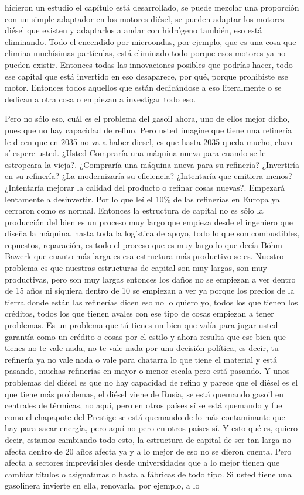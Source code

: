hicieron un estudio el capítulo está desarrollado, se puede mezclar una proporción con un simple adaptador en los motores diésel, se pueden adaptar los motores diésel que existen y adaptarlos a andar con hidrógeno también, eso está eliminando. Todo el encendido por microondas, por ejemplo, que es una cosa que elimina muchísimas partículas, está eliminado todo porque esos motores ya no pueden existir. Entonces todas las innovaciones posibles que podrías hacer, todo ese capital que está invertido en eso desaparece, por qué, porque prohibiste ese motor. Entonces todos aquellos que están dedicándose a eso literalmente o se dedican a otra cosa o empiezan a investigar todo eso.

Pero no sólo eso, cuál es el problema del gasoil ahora, uno de ellos mejor dicho, pues que no hay capacidad de refino. Pero usted imagine que tiene una refinería le dicen que en 2035 no va a haber diesel, es que hasta 2035 queda mucho, claro sí espere usted. ¿Usted Compraría una máquina nueva para cuando se le estropeara la vieja?. ¿Compraría una máquina nueva para su refinería? ¿Invertiría en su refinería? ¿La modernizaría su eficiencia? ¿Intentaría que emitiera menos? ¿Intentaría mejorar la calidad del producto o refinar cosas nuevas?. Empezará lentamente a desinvertir. Por lo que leí el 10\% de las refinerías en Europa ya cerraron como es normal. Entonces la estructura de capital no es sólo la producción del bien es un proceso muy largo que empieza desde el ingeniero que diseña la máquina, hasta toda la logística de apoyo, todo lo que son combustibles, repuestos, reparación, es todo el proceso que es muy largo lo que decía Böhm-Bawerk que cuanto más larga es esa estructura más productivo se es. Nuestro problema es que nuestras estructuras de capital son muy largas, son muy productivas, pero son muy largas entonces los daños no se empiezan a ver dentro de 15 años ni siquiera dentro de 10 se empiezan a ver ya porque los precios de la tierra donde están las refinerías dicen eso no lo quiero yo, todos los que tienen los créditos, todos los que tienen avales con ese tipo de cosas empiezan a tener problemas. Es un problema que tú tienes un bien que valía para jugar usted garantía como un crédito o cosas por el estilo y ahora resulta que ese bien que tienes no te vale nada, no te vale nada por una decisión política, es decir, tu refinería ya no vale nada o vale para chatarra lo que tiene el material y está pasando, muchas refinerías en mayor o menor escala pero está pasando. Y unos problemas del diésel es que no hay capacidad de refino y parece que el diésel es el que tiene más problemas, el diésel viene de Rusia, se está quemando gasoil en centrales de térmicas, no aquí, pero en otros países sí se está quemando y fuel como el chapapote del Prestige se está quemando de lo más contaminante que hay para sacar energía, pero aquí no pero en otros países sí. Y esto qué es, quiero decir, estamos cambiando todo esto, la estructura de capital de ser tan larga no afecta dentro de 20 años afecta ya y a lo mejor de eso no se dieron cuenta. Pero afecta a sectores imprevisibles desde universidades que a lo mejor tienen que cambiar títulos o asignaturas o hasta a fábricas de todo tipo. Si usted tiene una gasolinera invierte en ella, renovarla, por ejemplo, a lo 